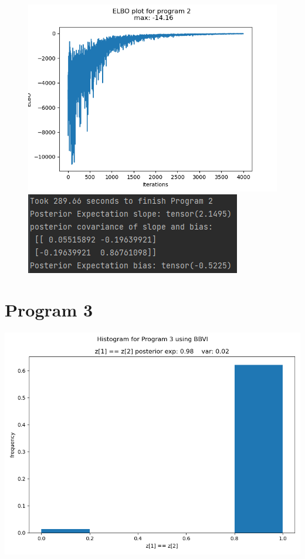 \documentclass[10pt]{homeworg}
\begin{document}
\begin{figure}[!htbp]
    \centering
    \begin{minipage}{0.45\textwidth}
        \centering
       \includegraphics[scale=0.5]{figures/elbo_program_2.png}
    \end{minipage}\hfill
    \begin{minipage}{0.45\textwidth}
        \centering
        \includegraphics[scale=0.8]{figures/program2_time.png}
    \end{minipage}
\end{figure}



\section{Program 3}
\begin{center}
\includegraphics[scale=0.5]{figures/BBVI_program_3.png}
\end{center}
\end{document}
